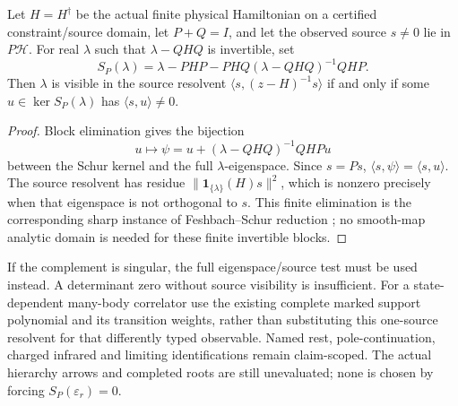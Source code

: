 \documentclass[12pt,a4paper]{article}
\begin{document}
\begin{proposition}
\label{p6:prop:v2210-lit-schur-source}
Let \(H=H^\dagger\) be the actual finite physical Hamiltonian on a certified
constraint/source domain, let \(P+Q=I\), and let the observed source
\(s\ne0\) lie in \(P\mathcal H\).  For real \(\lambda\) such that
\(\lambda-QHQ\) is invertible, set
\[
 S_P(\lambda)=\lambda-PHP
 -PHQ(\lambda-QHQ)^{-1}QHP.
\]
Then \(\lambda\) is visible in the source resolvent
\(\langle s,(z-H)^{-1}s\rangle\) if and only if some
\(u\in\ker S_P(\lambda)\) has \(\langle s,u\rangle\ne0\).
\end{proposition}
\begin{proof}
Block elimination gives the bijection
\[
 u\longmapsto
 \psi=u+(\lambda-QHQ)^{-1}QHPu
\]
between the Schur kernel and the full \(\lambda\)-eigenspace.
Since \(s=Ps\), \(\langle s,\psi\rangle=\langle s,u\rangle\).
The source resolvent has residue
\(\|\mathbf1_{\{\lambda\}}(H)s\|^2\), which is nonzero precisely when
that eigenspace is not orthogonal to \(s\).  This finite elimination is the
corresponding sharp instance of Feshbach--Schur reduction
\cite{LitSMFeshbach2007}; no smooth-map analytic domain is needed for these
finite invertible blocks.
\end{proof}
If the complement is singular, the full eigenspace/source test must be used
instead.  A determinant zero without source visibility is insufficient.
For a state-dependent many-body correlator use the existing complete marked
support polynomial and its transition weights, rather than substituting
this one-source resolvent for that differently typed observable.  Named rest,
pole-continuation, charged infrared and limiting identifications remain
claim-scoped.  The actual hierarchy arrows and completed roots are still
unevaluated; none is chosen by forcing \(S_P(\varepsilon_r)=0\).
\end{document}
